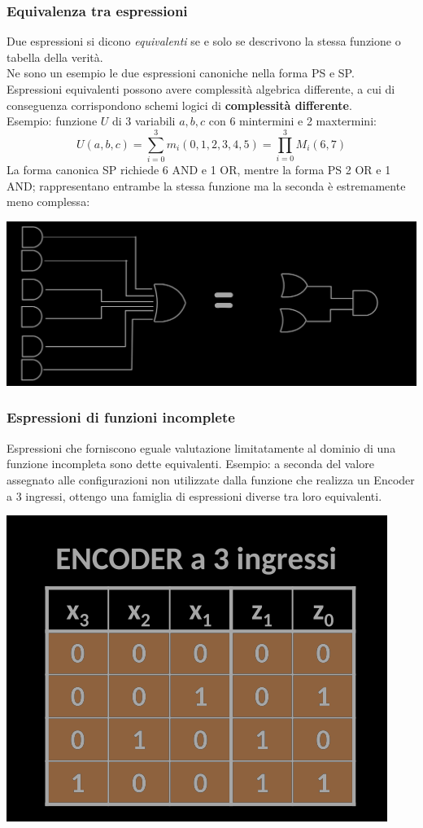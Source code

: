 \documentclass{article}
\begin{document}
\subsubsection{Equivalenza tra espressioni}
Due espressioni si dicono \textit{equivalenti} se e solo se descrivono la stessa funzione o tabella della verità.\\
Ne sono un esempio le due espressioni canoniche nella forma PS e SP.
\vspace{0.2cm}\\
Espressioni equivalenti possono avere complessità algebrica differente, a cui di conseguenza corrispondono schemi logici di \textbf{complessità differente}.
\vspace{0.1cm}\\
Esempio: funzione $U$ di 3 variabili $a,b,c$ con 6 mintermini e 2 maxtermini:
$$ U(a,b,c) = \sum_{i=0}^3 m_i(0,1,2,3,4,5)  = \prod_{i=0}^3 M_i(6,7) $$
La forma canonica SP richiede 6 AND e 1 OR, mentre la forma PS 2 OR e 1 AND; rappresentano entrambe la stessa funzione ma la seconda è estremamente meno complessa:
\begin{center}
    \includegraphics[scale=0.3]{es3}
\end{center}
\subsubsection{Espressioni di funzioni incomplete}
Espressioni che forniscono eguale valutazione limitatamente al dominio di una funzione incompleta sono dette equivalenti.
Esempio: a seconda del valore assegnato alle configurazioni non utilizzate dalla funzione che realizza un Encoder a 3 ingressi, ottengo una famiglia di espressioni diverse tra loro equivalenti.
\begin{center}
    \includegraphics[scale=0.5]{enc3ing.png}
\end{center}
\end{document}
